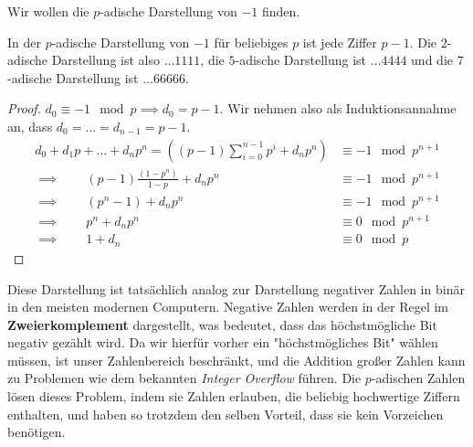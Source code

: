 \documentclass{report}
\newcommand*{\newpar}{\par\vspace{\baselineskip}\noindent}
\newcommand{\tbf}[1]{\textbf{#1}}
\begin{document}
	\begin{example}
		Wir wollen die $p$-adische Darstellung von $-1$ finden.
		\iffalse
		\newpar
		Wir brauchen also eine Folge $d_n$, sodass für jedes $n$
		\begin{align*}
			d_0 + d_1 2 + \hdots + d_n 2^n \equiv -1 \mod 2^{n+1}
		\end{align*}
		Für $n = 0$ erhalten wir:
		\begin{align*}
			d_0 \equiv -1 \mod 2
		\end{align*}
		also $d_0 = 1$. Wir wollen induktiv Zeigen, dass alle anderen Ziffern ebenfalls $1$ sind. Angenommen, $d_0 = d_1 = \hdots = d_{n-1} = 1$. Dann gilt:
		\begin{align*}
			d_0 + 2d_1 + \hdots + 2^nd_n  = \left(\sum_{i = 0}^{n-1} 2^i + d_n 2^n\right) 
			&\equiv -1 \mod 2^{n+1}\\
			\implies \qquad (2^n - 1) + d_n 2^n &\equiv -1 \mod 2^{n+1}\\
			\implies \qquad 2^n + d_n 2^n  &\equiv 0 \mod 2^{n+1}\\
			\implies \qquad 1 + d_n &\equiv 0 \mod 2
		\end{align*}
		Also $d_n = 1$. Die $2$-adische Darstellung von $-1$ ist also $\hdots1111$.
		\fi
	\end{example}
	\begin{lemma}
		In der $p$-adische Darstellung von $-1$ für beliebiges $p$ ist jede Ziffer $p-1$. Die $2$-adische Darstellung ist also $\hdots1111$, die $5$-adische Darstellung ist $\hdots4444$ und die $7$-adische Darstellung ist $\hdots66666$.
	\end{lemma}
	\begin{proof}
		$d_0 \equiv -1 \mod p \implies d_0 = p - 1$. Wir nehmen also als Induktionsannahme an, dass $d_0 = \hdots = d_{n-1} = p-1$.
		\begin{align*}
			d_0 + d_1p + \hdots + d_np^n = \left((p-1)\sum_{i = 0}^{n-1} p^i + d_n p^n\right) 
			&\equiv -1 \mod p^{n+1}\\
			\implies \qquad (p-1)\frac{(1 - p^n)}{1-p} + d_n p^n &\equiv -1 \mod p^{n+1}\\
			\implies \qquad (p^n - 1) + d_n p^n &\equiv -1 \mod p^{n+1}\\
			\implies \qquad p^n + d_n p^n  &\equiv 0 \mod p^{n+1}\\
			\implies \qquad 1 + d_n &\equiv 0 \mod p
		\end{align*}
	\end{proof}
	
	\noindent Diese Darstellung ist tatsächlich analog zur Darstellung negativer Zahlen in binär in den meisten modernen Computern. Negative Zahlen werden in der Regel im \tbf{Zweierkomplement} dargestellt, was bedeutet, dass das höchstmögliche Bit negativ gezählt wird. Da wir hierfür vorher ein "höchstmögliches Bit" wählen müssen, ist unser Zahlenbereich beschränkt, und die Addition großer Zahlen kann zu Problemen wie dem bekannten \textit{Integer Overflow} führen. Die $p$-adischen Zahlen lösen dieses Problem, indem sie Zahlen erlauben, die beliebig hochwertige Ziffern enthalten, und haben so trotzdem den selben Vorteil, dass sie kein Vorzeichen benötigen.
\end{document}
